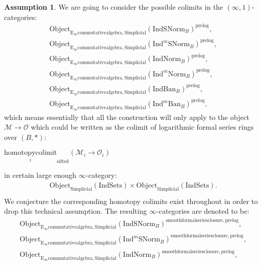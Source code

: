 \documentclass[11pt]{book}
\theoremstyle{definition}
\numberwithin{equation}{section}
\newtheorem{assumption}[theorem]{Assumption}
\begin{document}
\begin{assumption}
We are going to consider the possible colimits in the $(\infty,1)$-categories:
\begin{align}
\mathrm{Object}_{\mathrm{E}_\infty\mathrm{commutativealgebra},\mathrm{Simplicial}}(\mathrm{IndSNorm}_B)^{\text{prelog}},\\
\mathrm{Object}_{\mathrm{E}_\infty\mathrm{commutativealgebra},\mathrm{Simplicial}}(\mathrm{Ind}^m\mathrm{SNorm}_B)^{\text{prelog}},\\
\mathrm{Object}_{\mathrm{E}_\infty\mathrm{commutativealgebra},\mathrm{Simplicial}}(\mathrm{IndNorm}_B)^{\text{prelog}},\\
\mathrm{Object}_{\mathrm{E}_\infty\mathrm{commutativealgebra},\mathrm{Simplicial}}(\mathrm{Ind}^m\mathrm{Norm}_B)^{\text{prelog}},\\
\mathrm{Object}_{\mathrm{E}_\infty\mathrm{commutativealgebra},\mathrm{Simplicial}}(\mathrm{IndBan}_B)^{\text{prelog}},\\
\mathrm{Object}_{\mathrm{E}_\infty\mathrm{commutativealgebra},\mathrm{Simplicial}}(\mathrm{Ind}^m\mathrm{Ban}_B)^{\text{prelog}},
\end{align}
which means essentially that all the construction will only apply to the object $\mathcal{M}\rightarrow\mathcal{O}$ which could be written as the colimit of logarithmic formal series rings over $(B,*)$:
\begin{center}
$\underset{i}{\text{homotopycolimit}}_\text{sifted}(\mathcal{M}_i\rightarrow\mathcal{O}_i)$
\end{center}
in certain large enough $\infty$-category:
\begin{align}
\mathrm{Object}_{\mathrm{Simplicial}}(\mathrm{IndSets})\times \mathrm{Object}_{\mathrm{Simplicial}}(\mathrm{IndSets}).\\
\end{align}
We conjecture the corresponding homotopy colimits exist throughout in order to drop this technical assumption. The resulting $\infty$-categories are denoted to be:
\begin{align}
\mathrm{Object}_{\mathrm{E}_\infty\mathrm{commutativealgebra},\mathrm{Simplicial}}(\mathrm{IndSNorm}_{B})^{\mathrm{smoothformalseriesclosure},\text{prelog}},\\
\mathrm{Object}_{\mathrm{E}_\infty\mathrm{commutativealgebra},\mathrm{Simplicial}}(\mathrm{Ind}^m\mathrm{SNorm}_{B})^{\mathrm{smoothformalseriesclosure},\text{prelog}},\\
\mathrm{Object}_{\mathrm{E}_\infty\mathrm{commutativealgebra},\mathrm{Simplicial}}(\mathrm{IndNorm}_{B})^{\mathrm{smoothformalseriesclosure},\text{prelog}},\\

\end{align}
\end{assumption}
\end{document}
